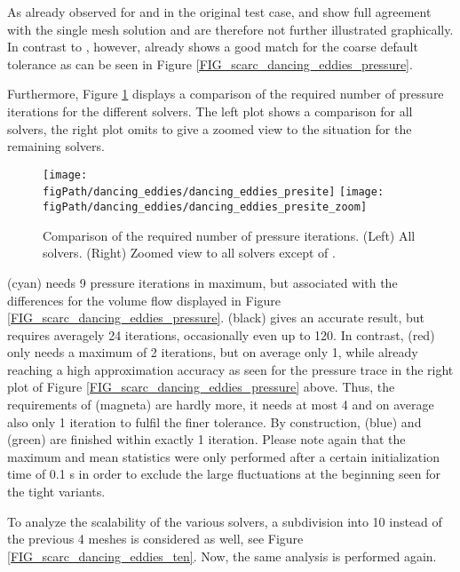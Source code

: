 As already observed for \ffttight{} and \uglmat{} in the original test case, \scarctight{} and \uscarc{} show full agreement with the single mesh solution and are therefore not further illustrated graphically.
In contrast to \fftdefault{}, however, \scarcdefault{} already shows a good match for the coarse default tolerance as can be seen in Figure \ref{FIG_scarc_dancing_eddies_pressure}. 

Furthermore, Figure \ref{FIG_scarc_dancing_eddies_presite} displays a comparison of the required number of pressure iterations for the different solvers. The left plot shows a comparison for all solvers, the right plot omits \ffttight{} to give a zoomed view to the situation for the remaining solvers. 

\begin{figure}[ht]
\begin{center}
\texttt{[image: \\figPath/dancing\_eddies/dancing\_eddies\_presite]}
\texttt{[image: \\figPath/dancing\_eddies/dancing\_eddies\_presite\_zoom]}
\end{center}
\caption[Results of different \scarc{} variants for the  {} test cases]{Comparison of the required number of pressure iterations. (Left) All solvers. (Right) Zoomed view to all solvers except of \ffttight{}.}
\label{FIG_scarc_dancing_eddies_presite}
\end{figure}

\fftdefault{} (cyan) needs 9 pressure iterations in maximum, but associated with the differences for the volume flow displayed in Figure \ref{FIG_scarc_dancing_eddies_pressure}. \ffttight{} (black) gives an accurate result, but requires averagely 24 iterations, occasionally even up to 120. 
In contrast, \scarcdefault{} (red) only needs a maximum of 2 iterations, but on average only 1, while already reaching a high approximation accuracy as seen for the pressure trace in the right plot of Figure \ref{FIG_scarc_dancing_eddies_pressure} above.
Thus, the requirements of \scarctight{} (magneta) are hardly more, it needs at most 4 and on average also only 1 iteration
to fulfil the finer tolerance.
By construction, \uglmat{} (blue) and \uscarc{} (green) are finished within exactly 1 iteration.
Please note again that the maximum and mean statistics were only performed after a certain initialization time of 0.1 s in order to exclude the large fluctuations at the beginning seen for the tight variants.


To analyze the scalability of the various solvers, a subdivision into 10 instead of the previous 4 meshes is considered as well, see Figure \ref{FIG_scarc_dancing_eddies_ten}. Now, the same analysis is performed again.

